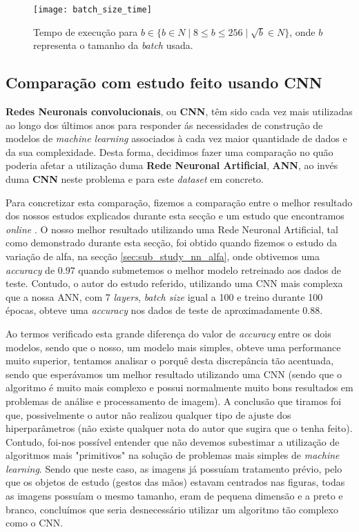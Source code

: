 \begin{figure}[!t]
\centering
\texttt{[image: batch\_size\_time]}
\caption{Tempo de execução para $b \in \{ b \in \!N \mid 8 \leq b \leq 256 \mid \sqrt{b} \in \!N \}$, onde $b$ representa o tamanho da \textit{batch} usada.}
\label{fig:batch_size_time}
\end{figure}

\subsection{Comparação com estudo feito usando CNN}             %
\textbf{Redes Neuronais convolucionais}, ou \textbf{CNN}, têm sido cada vez mais utilizadas ao longo dos últimos anos para responder ás necessidades de construção de modelos de \textit{machine learning} associados à cada vez maior quantidade de dados e da sua complexidade. Desta forma, decidimos fazer uma comparação no quão poderia afetar a utilização duma \textbf{Rede Neuronal Artificial}, \textbf{ANN}, ao invés duma \textbf{CNN} neste problema e para este \textit{dataset} em concreto. 

Para concretizar esta comparação, fizemos a comparação entre o melhor resultado dos nossos estudos explicados durante esta secção e um estudo que encontramos \textit{online} \cite{comparation_cnn}. O nosso melhor resultado utilizando uma Rede Neuronal Artificial, tal como demonstrado durante esta secção, foi obtido quando fizemos o estudo da variação de alfa, na secção \ref{sec:sub_study_nn_alfa}, onde obtivemos uma \textit{accuracy} de $0.97$ quando submetemos o melhor modelo retreinado aos dados de teste. Contudo, o autor do estudo referido, utilizando uma CNN mais complexa que a nossa ANN, com 7 \textit{layers}, \textit{batch size} igual a 100 e treino durante 100 épocas, obteve uma \textit{accuracy} nos dados de teste de aproximadamente $0.88$. 

Ao termos verificado esta grande diferença do valor de \textit{accuracy} entre os dois modelos, sendo que o nosso, um modelo mais simples, obteve uma performance muito superior, tentamos analisar o porquê desta discrepância tão acentuada, sendo que esperávamos um melhor resultado utilizando uma CNN (sendo que o algoritmo é muito mais complexo e possui normalmente muito bons resultados em problemas de análise e processamento de imagem). A conclusão que tiramos foi que, possivelmente o autor não realizou qualquer tipo de ajuste dos hiperparâmetros (não existe qualquer nota do autor que sugira que o tenha feito). Contudo, foi-nos possível entender que não devemos subestimar a utilização de algoritmos mais "primitivos" na solução de problemas mais simples de \textit{machine learning}. Sendo que neste caso, as imagens já possuíam tratamento prévio, pelo que os objetos de estudo (gestos das mãos) estavam centrados nas figuras, todas as imagens possuíam o mesmo tamanho, eram de pequena dimensão e a preto e branco, concluímos que seria desnecessário utilizar um algoritmo tão complexo como o CNN.


